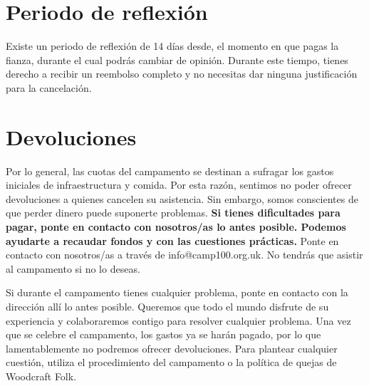 \documentclass[a4paper, 11pt]{report}
\begin{document}
\section{Periodo de reflexi\'on}
Existe un periodo de reflexi\'on de 14 d\'ias desde, el momento en que pagas la fianza, durante el cual podr\'as cambiar de opini\'on. Durante este tiempo, tienes derecho a recibir un reembolso completo y no necesitas dar ninguna justificaci\'on para la cancelaci\'on.  

\section{Devoluciones}
Por lo general, las cuotas del campamento se destinan a sufragar los gastos iniciales de infraestructura y comida.  Por esta raz\'on, sentimos no poder ofrecer devoluciones a quienes cancelen su asistencia. Sin embargo, somos conscientes de que perder dinero puede suponerte problemas. \textbf{Si tienes dificultades para pagar, ponte en contacto con nosotros/as lo antes posible. Podemos ayudarte a recaudar fondos y con las cuestiones pr\'acticas.} Ponte en contacto con nosotros/as a trav\'es de info@camp100.org.uk. No tendr\'as que asistir al campamento si no lo deseas. 
 
Si durante el campamento tienes cualquier problema, ponte en contacto con la direcci\'on all\'i lo antes posible. Queremos que todo el mundo disfrute de su experiencia y colaboraremos contigo para resolver cualquier problema. Una vez que se celebre el campamento, los gastos ya se har\'an pagado, por lo que lamentablemente no podremos ofrecer devoluciones. Para plantear cualquier cuesti\'on, utiliza el procedimiento del campamento o la pol\'itica de quejas de Woodcraft Folk.


\makedocumentbackpage
\end{document}
